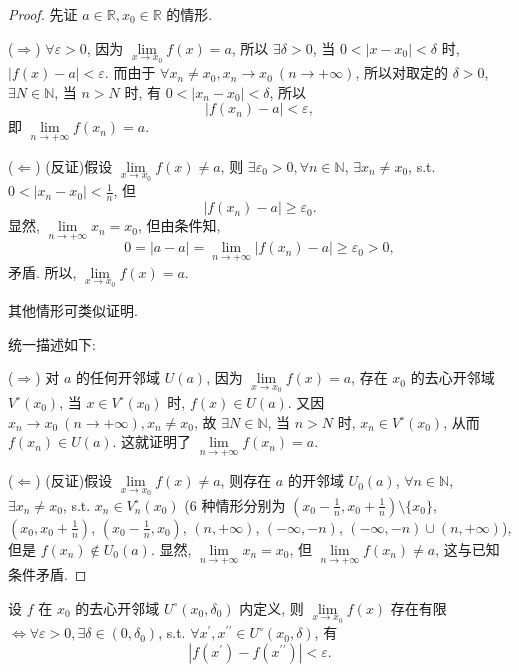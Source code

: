 \begin{proof}
先证 $a \in \mathbb{R}, x_0 \in \mathbb{R}$ 的情形.

($\Rightarrow$) $\forall\varepsilon>0$, 因为 $\lim\limits_{x\to x_0}f(x)=a$, 所以 $\exists\delta>0$, 当 $0<|x-x_0|<\delta$ 时, $|f(x)-a|<\varepsilon$. 而由于 $\forall x_n\neq x_0, x_n\to x_0\ (n\to+\infty)$, 所以对取定的 $\delta>0$, $\exists N\in\mathbb{N}$, 当 $n>N$ 时, 有 $0<|x_n-x_0|<\delta$, 所以
\[
|f(x_{n})-a|<\varepsilon,
\]
即 $\lim\limits_{n\to+\infty}f(x_{n})=a$.

($\Leftarrow$) (反证)假设 $\lim\limits_{x \to x_0} f(x) \neq a$, 则 $\exists \varepsilon_0 > 0, \forall n \in \mathbb{N}$, $\exists x_n \neq x_0$, s.t. $0 < |x_n - x_0| < \frac{1}{n}$, 但
\[
|f(x_{n})-a|\geqslant\varepsilon_{0}.
\]
显然, $\lim\limits_{n\to+\infty} x_{n}=x_{0}$, 但由条件知,
\[
0=|a-a|=\lim_{n\to+\infty}|f(x_{n})-a|\geqslant\varepsilon_{0}>0,
\]
矛盾. 所以, $\lim\limits_{x\to x_0}f(x)=a$.

其他情形可类似证明.

统一描述如下:

($\Rightarrow$) 对 $a$ 的任何开邻域 $U(a)$, 因为 $\lim\limits_{x \to x_0} f(x) = a$, 存在 $x_0$ 的去心开邻域 $V^\circ(x_0)$, 当 $x \in V^\circ(x_0)$ 时, $f(x) \in U(a)$. 又因 $x_n \to x_0\ (n \to +\infty), x_n \neq x_0$, 故 $\exists N \in \mathbb{N}$, 当 $n > N$ 时, $x_n \in V^\circ(x_0)$, 从而 $f(x_n) \in U(a)$. 这就证明了 $\lim\limits_{n \to +\infty} f(x_n) = a$.

($\Leftarrow$) (反证)假设 $\lim\limits_{x\to x_0}f(x)\neq a$, 则存在 $a$ 的开邻域 $U_0(a)$, $\forall n\in\mathbb{N}$, $\exists x_n\neq x_0$, s.t. $x_n\in V^\circ_n(x_0)$ (6 种情形分别为 $(x_0-\frac{1}{n},x_0+\frac{1}{n})\setminus\{x_0\}$, $(x_0,x_0+\frac{1}{n})$, $(x_0-\frac{1}{n},x_0)$, $(n,+\infty)$, $(-\infty,-n)$, $(-\infty,-n)\cup(n,+\infty)$), 但是 $f(x_n)\notin U_0(a)$. 显然, $\lim\limits_{n\to+\infty}x_n=x_0$, 但 $\lim\limits_{n\to+\infty}f(x_n)\neq a$, 这与已知条件矛盾.
\end{proof}

\begin{theorem}\label{thm:2.1.4}
设 $f$ 在 $x_{0}$ 的去心开邻域 $U^{\circ}(x_{0},\delta_{0})$ 内定义, 则 $\lim\limits_{x\to x_0} f(x)$ 存在有限 $\iff \forall\varepsilon>0,\exists\delta\in(0,\delta_{0})$, s.t. $\forall x^{\prime},x^{\prime\prime}\in U^{\circ}(x_{0},\delta)$, 有
\[
|f(x^{\prime})-f(x^{\prime \prime})|<\varepsilon.
\]
\end{theorem}

